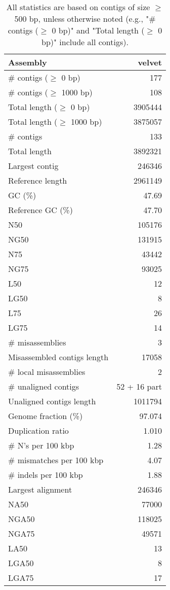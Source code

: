 \documentclass[12pt,a4paper]{article}
\begin{document}
\begin{table}[ht]
\begin{center}
\caption{All statistics are based on contigs of size $\geq$ 500 bp, unless otherwise noted (e.g., "\# contigs ($\geq$ 0 bp)" and "Total length ($\geq$ 0 bp)" include all contigs).}
\begin{tabular}{|l*{1}{|r}|}
\hline
Assembly & velvet \\ \hline
\# contigs ($\geq$ 0 bp) & 177 \\ \hline
\# contigs ($\geq$ 1000 bp) & 108 \\ \hline
Total length ($\geq$ 0 bp) & 3905444 \\ \hline
Total length ($\geq$ 1000 bp) & 3875057 \\ \hline
\# contigs & 133 \\ \hline
Total length & 3892321 \\ \hline
Largest contig & 246346 \\ \hline
Reference length & 2961149 \\ \hline
GC (\%) & 47.69 \\ \hline
Reference GC (\%) & 47.70 \\ \hline
N50 & 105176 \\ \hline
NG50 & 131915 \\ \hline
N75 & 43442 \\ \hline
NG75 & 93025 \\ \hline
L50 & 12 \\ \hline
LG50 & 8 \\ \hline
L75 & 26 \\ \hline
LG75 & 14 \\ \hline
\# misassemblies & 3 \\ \hline
Misassembled contigs length & 17058 \\ \hline
\# local misassemblies & 2 \\ \hline
\# unaligned contigs & 52 + 16 part \\ \hline
Unaligned contigs length & 1011794 \\ \hline
Genome fraction (\%) & 97.074 \\ \hline
Duplication ratio & 1.010 \\ \hline
\# N's per 100 kbp & 1.28 \\ \hline
\# mismatches per 100 kbp & 4.07 \\ \hline
\# indels per 100 kbp & 1.88 \\ \hline
Largest alignment & 246346 \\ \hline
NA50 & 77000 \\ \hline
NGA50 & 118025 \\ \hline
NGA75 & 49571 \\ \hline
LA50 & 13 \\ \hline
LGA50 & 8 \\ \hline
LGA75 & 17 \\ \hline
\end{tabular}
\end{center}
\end{table}
\end{document}
